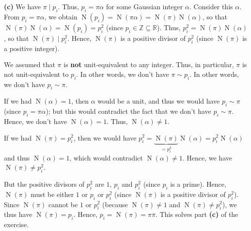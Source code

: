 \documentclass[paper=a4, fontsize=12pt]{scrartcl}%
\theoremstyle{plainsl}
\theoremstyle{definition}
\theoremstyle{remark}
\begin{document}
\bigskip

\textbf{(c)} We have $\pi\mid p_{i}$. Thus, $p_{i}=\pi\alpha$ for some
Gaussian integer $\alpha$. Consider this $\alpha$. From $p_{i}=\pi\alpha$, we
obtain $\operatorname*{N}\left(  p_{i}\right)  =\operatorname*{N}\left(
\pi\alpha\right)  =\operatorname*{N}\left(  \pi\right)  \operatorname*{N}%
\left(  \alpha\right)  $, so that $\operatorname*{N}\left(  \pi\right)
\operatorname*{N}\left(  \alpha\right)  =\operatorname*{N}\left(
p_{i}\right)  =p_{i}^{2}$ (since $p_{i}\in\mathbb{Z}\subseteq\mathbb{R}$).
Thus, $p_{i}^{2}=\operatorname*{N}\left(  \pi\right)  \operatorname*{N}\left(
\alpha\right)  $, so that $\operatorname*{N}\left(  \pi\right)  \mid p_{i}%
^{2}$. Hence, $\operatorname*{N}\left(  \pi\right)  $ is a positive divisor of
$p_{i}^{2}$ (since $\operatorname*{N}\left(  \pi\right)  $ is a positive integer).

We assumed that $\pi$ is \textbf{not} unit-equivalent to any integer. Thus, in
particular, $\pi$ is not unit-equivalent to $p_{i}$. In other words, we don't
have $\pi\sim p_{i}$. In other words, we don't have $p_{i}\sim\pi$.

If we had $\operatorname*{N}\left(  \alpha\right)  =1$, then $\alpha$ would be
a unit, and thus we would have $p_{i}\sim\pi$ (since $p_{i}=\pi\alpha$); but
this would contradict the fact that we don't have $p_{i}\sim\pi$. Hence, we
don't have $\operatorname*{N}\left(  \alpha\right)  =1$. Thus,
$\operatorname*{N}\left(  \alpha\right)  \neq1$.

If we had $\operatorname*{N}\left(  \pi\right)  =p_{i}^{2}$, then we would
have $p_{i}^{2}=\underbrace{\operatorname*{N}\left(  \pi\right)  }_{=p_{i}%
^{2}}\operatorname*{N}\left(  \alpha\right)  =p_{i}^{2}\operatorname*{N}%
\left(  \alpha\right)  $ and thus $\operatorname*{N}\left(  \alpha\right)
=1$, which would contradict $\operatorname*{N}\left(  \alpha\right)  \neq1$.
Hence, we have $\operatorname*{N}\left(  \pi\right)  \neq p_{i}^{2}$.

But the positive divisors of $p_{i}^{2}$ are $1$, $p_{i}$ and $p_{i}^{2}$
(since $p_{i}$ is a prime). Hence, $\operatorname*{N}\left(  \pi\right)  $
must be either $1$ or $p_{i}$ or $p_{i}^{2}$ (since $\operatorname*{N}\left(
\pi\right)  $ is a positive divisor of $p_{i}^{2}$). Since $\operatorname*{N}%
\left(  \pi\right)  $ cannot be $1$ or $p_{i}^{2}$ (because $\operatorname*{N}%
\left(  \pi\right)  \neq1$ and $\operatorname*{N}\left(  \pi\right)  \neq
p_{i}^{2}$), we thus have $\operatorname*{N}\left(  \pi\right)  =p_{i}$.
Hence, $p_{i}=\operatorname*{N}\left(  \pi\right)  =\pi\overline{\pi}$. This
solves part \textbf{(c)} of the exercise.
\end{document}
